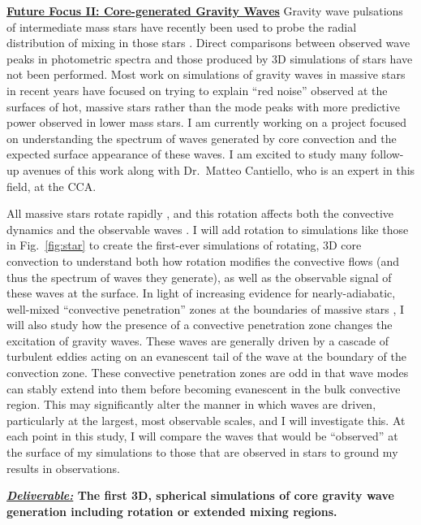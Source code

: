 \documentclass[12pt]{article}
\newcommand{\sct}[1]{\vspace{0.3cm}\hspace{-\parindent}\textbf{\underline{#1}}\hspace{0.3cm}}
\begin{document}
\sct{Future Focus II: Core-generated Gravity Waves}
Gravity wave pulsations of intermediate mass stars have recently been used to probe the radial distribution of mixing in those stars \citep{pedersen_etal_2021}.
Direct comparisons between observed wave peaks in photometric spectra \citep{decat_aerts_2002, pedersen_etal_2021} and those produced by 3D simulations of stars have not been performed.
Most work on simulations of gravity waves in massive stars in recent years \citep{edelmann_etal_2019,horst_etal_2020} have focused on trying to explain ``red noise'' \citep{bowman_etal_2019} observed at the surfaces of hot, massive stars rather than the mode peaks with more predictive power observed in lower mass stars.
I am currently working on a project focused on understanding the spectrum of waves generated by core convection and the expected surface appearance of these waves.
I am excited to study many follow-up avenues of this work along with Dr.~Matteo Cantiello, who is an expert in this field, at the CCA.

All massive stars rotate rapidly \citep{jermyn_etal_2022_atlas}, and this rotation affects both the convective dynamics \citep{aurnou_etal_2020} and the observable waves \citep[e.g.,][]{papics_etal_2017}.
I will add rotation to simulations like those in Fig.~\ref{fig:star} to create the first-ever simulations of rotating, 3D core convection to understand both how rotation modifies the convective flows (and thus the spectrum of waves they generate), as well as the observable signal of these waves at the surface.
In light of increasing evidence for nearly-adiabatic, well-mixed ``convective penetration'' zones at the boundaries of massive stars \citep{pedersen_etal_2021,anders_etal_2022a}, I will also study how the presence of a convective penetration zone changes the excitation of gravity waves.
These waves are generally driven by a cascade of turbulent eddies acting on an evanescent tail of the wave at the boundary of the convection zone.
These convective penetration zones are odd in that wave modes can stably extend into them before becoming evanescent in the bulk convective region.
This may significantly alter the manner in which waves are driven, particularly at the largest, most observable scales, and I will investigate this.
At each point in this study, I will compare the waves that would be ``observed'' at the surface of my simulations to those that are observed in stars to ground my results in observations.

\textbf{\underline{\emph{Deliverable:}} The first 3D, spherical simulations of core gravity wave generation including rotation or extended mixing regions.}
\end{document}
